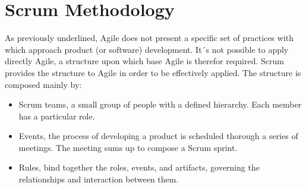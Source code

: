 \documentclass[../main.tex]{subfiles}
\newcommand\connecttw[2]%
  {\draw[->,thick] (#1) -| (#2);
   \draw[->,thick] (#2) -| (#1);
  }
\begin{document}
\section{Scrum Methodology}
As previously underlined, Agile does not present a specific set of practices with which approach product (or software) development. It´s not possible to apply directly Agile, a structure upon which base Agile is therefor required. Scrum provides the structure to Agile in order to be effectively applied. The structure is composed mainly by:
\begin{itemize}
    \item Scrum teams, a small group of people with a defined hierarchy. Each member has a particular role. 
    \item Events, the process of developing a product is scheduled thorough a series of meetings. The meeting sums up to compose a Scrum sprint.
    \item Rules, bind together the roles, events, and artifacts, governing the relationships and interaction between them.
\end{itemize}
\end{document}
